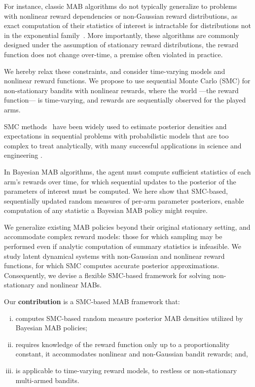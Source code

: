 For instance, classic MAB algorithms do not typically generalize to problems
with nonlinear reward dependencies or non-Gaussian reward distributions,
as exact computation of their statistics of interest is intractable for distributions not in the exponential family~\citep{ic-Korda2013,j-Russo2018}.
More importantly, these algorithms are commonly designed under the assumption of stationary reward distributions,
\ie the reward function does not change over-time,
a premise often violated in practice.

We hereby relax these constraints,
and consider time-varying models and nonlinear reward functions.
We propose to use sequential Monte Carlo (SMC) for non-stationary bandits with nonlinear rewards,
where the world ---the reward function--- is time-varying,
and rewards are sequentially observed for the played arms.

SMC methods~\citep{j-Arulampalam2002,b-Doucet2001,j-Djuric2003} have been widely used
to estimate posterior densities and expectations in sequential problems with probabilistic models
that are too complex to treat analytically,
with many successful applications in science and engineering \citep{b-Ristic2004,j-Leeuwen2009,j-Ionides2006,j-Creal2012}.

In Bayesian MAB algorithms,
the agent must compute sufficient statistics of each arm's rewards over time,
for which sequential updates to the posterior of the parameters of interest must be computed.
We here show that SMC-based, sequentially updated random measures of per-arm parameter posteriors,
enable computation of any statistic a Bayesian MAB policy might require.

We generalize existing MAB policies beyond their original stationary setting,
and accommodate complex reward models:
those for which sampling may be performed even if analytic computation of summary statistics is infeasible.
%
We study latent dynamical systems with non-Gaussian and nonlinear reward functions,
for which SMC computes accurate posterior approximations.
Consequently, we devise a flexible SMC-based framework for solving non-stationary and nonlinear MABs.

Our \textbf{contribution} is a SMC-based MAB framework that:
\begin{enumerate}[(i)]
	\item computes SMC-based random measure posterior MAB densities utilized by Bayesian MAB policies;
	\item requires knowledge of the reward function only up to a proportionality constant,
		\ie it accommodates nonlinear and non-Gaussian bandit rewards; and,
	\item is applicable to time-varying reward models, \ie to restless or non-stationary multi-armed bandits.
\end{enumerate}

